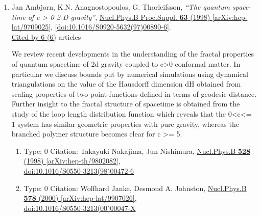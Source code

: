 \documentclass[a4paper,10pt]{article}
\begin{document}
\begin{enumerate}
\item Jan Ambjorn, K.N. Anagnostopoulos, G. Thorleifsson, {\it ``The quantum space-time of c > 0 2-D gravity''}, \href{https://www.doi.org/10.1016/S0920-5632(97)00890-6}{Nucl.Phys.B Proc.Suppl. {\bf 63} (1998) } \href{https://arxiv.org/abs/hep-lat/9709025}{[arXiv:hep-lat/9709025]}, \href{https://www.doi.org/10.1016/S0920-5632(97)00890-6}{[doi:10.1016/S0920-5632(97)00890-6]}.
\\\href{https://inspirehep.net/literature/?q=refersto%3Arecid%3A448238}{Cited by 6 (6)} articles

We review recent developments in the understanding of the fractal properties of quantum spacetime of 2d gravity coupled to c>0 conformal matter. In particular we discuss bounds put by numerical simulations using dynamical triangulations on the value of the Hausdorff dimension dH obtained from scaling properties of two point functions defined in terms of geodesic distance. Further insight to the fractal structure of spacetime is obtained from the study of the loop length distribution function which reveals that the 0<c<= 1 system has similar geometric properties with pure gravity, whereas the branched polymer structure becomes clear for c >= 5.
\begin{enumerate}
  \item Type: 0 Citation: Takayuki Nakajima, Jun Nishimura, \href{https://www.doi.org/10.1016/S0550-3213(98)00472-6}{Nucl.Phys.B {\bf 528} (1998) }  \href{https://arxiv.org/abs/hep-th/9802082}{[arXiv:hep-th/9802082]},\\\href{https://www.doi.org/10.1016/S0550-3213(98)00472-6}{doi:10.1016/S0550-3213(98)00472-6}
  \item Type: 0 Citation: Wolfhard Janke, Desmond A. Johnston, \href{https://www.doi.org/10.1016/S0550-3213(00)00047-X}{Nucl.Phys.B {\bf 578} (2000) }  \href{https://arxiv.org/abs/hep-lat/9907026}{[arXiv:hep-lat/9907026]},\\\href{https://www.doi.org/10.1016/S0550-3213(00)00047-X}{doi:10.1016/S0550-3213(00)00047-X}

\end{enumerate}
\end{enumerate}
\end{document}
